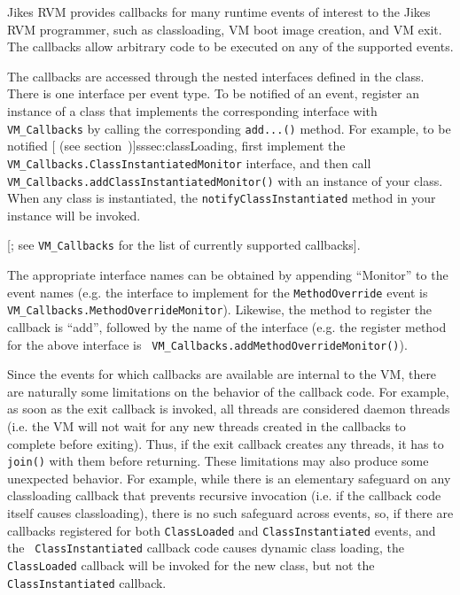 

Jikes\TMweb{} RVM provides callbacks for many runtime events of
interest to the Jikes RVM 
programmer, such as classloading, VM boot image creation, and VM exit.  The
callbacks allow arbitrary code to be executed on any of the supported events.

The callbacks are accessed through the nested interfaces defined in the 
class.  There is one interface per event type.  To be notified
of an event, register an instance of a class that implements the corresponding
interface with {\tt VM\_Callbacks} by calling the corresponding {\tt add...()}
method.  For example, to be notified [ (see section~\Ref)]{sssec:classLoading}, first implement the {\tt
VM\_Callbacks.ClassInstantiatedMonitor} interface, and then call {\tt
VM\_Callbacks.addClassInstantiatedMonitor()} with an instance of your class.
When any class is instantiated, the {\tt notifyClassInstantiated} method in
your instance will be invoked.

[; see 
{\tt VM\_Callbacks} for the list of currently
supported callbacks]{\VMCallbacksURL}.

The appropriate interface names can be obtained by appending ``Monitor'' to the
event names (e.g. the interface to implement for the {\tt MethodOverride} event
is {\tt VM\_Callbacks.MethodOverrideMonitor}).  Likewise, the method to
register the callback is ``add'', followed by the name of the interface (e.g.
the register method for the above interface is {\tt
VM\_Callbacks.addMethodOverrideMonitor()}).

Since the events for which callbacks are available are internal to the VM,
there are naturally some limitations on the behavior of the callback code.  For
example, as soon as the exit callback is invoked, all threads are considered
daemon threads (i.e. the VM will not wait for any new threads created in the
callbacks to complete before exiting).  Thus, if the exit callback creates any
threads, it has to {\tt join()} with them before returning.  These limitations
may also produce some unexpected behavior.  For example, while there is an
elementary safeguard on any classloading callback that prevents recursive
invocation (i.e. if the callback code itself causes classloading), there is no
such safeguard across events, so, if there are callbacks registered for both
{\tt ClassLoaded} and {\tt ClassInstantiated} events, and the {\tt
ClassInstantiated} callback code causes dynamic class loading, the {\tt
ClassLoaded} callback will be invoked for the new class, but not the {\tt
ClassInstantiated} callback.

